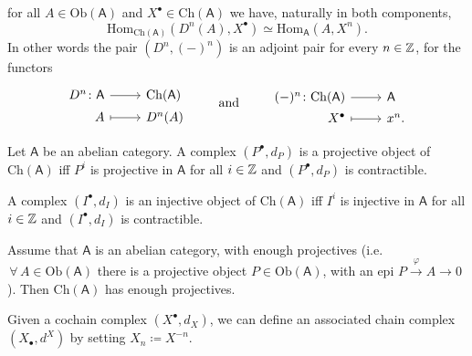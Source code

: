 \begin{lem}
	for all $A \in \mathrm{Ob} \left(\mathsf{A}\right)$ and $X^\bullet \in \mathrm{Ch}(\mathsf{A})$ we have,
	naturally in both components,
	\begin{equation}
		\mathrm{Hom}_{\mathrm{Ch}(\mathsf{A})} \left( D^n(A), X^\bullet \right) \simeq
		\mathrm{Hom}_{\mathsf{A}} \left( A, X^n \right)
	.\end{equation} 
	In other words the pair $(D^n, (-)^n)$ is an adjoint pair for every $n \in \mathbb{Z}$, for the functors
	\begin{equation*}
	\begin{tikzcd}[row sep = 0ex
		,/tikz/column 1/.append style={anchor=base east}
		,/tikz/column 2/.append style={anchor=base west}]
		D^n\colon \mathsf{A} \arrow[r, "", rightarrow] &
		\mathrm{Ch}(\mathsf{A}) \\
		A \arrow[r, "", mapsto] & D^n(A)
	\end{tikzcd}
	\qquad \text{ and } \qquad
	\begin{tikzcd}[row sep = 0ex
		,/tikz/column 1/.append style={anchor=base east}
		,/tikz/column 2/.append style={anchor=base west}]
		(-)^n\colon \mathrm{Ch}(\mathsf{A}) \arrow[r, "", rightarrow] &
		\mathsf{A} \\
		X^\bullet \arrow[r, "", mapsto] & x^n
	.\end{tikzcd}
	\end{equation*} 
\end{lem} 

\begin{prop}
	Let $\mathsf{A}$ be an abelian category.
	A complex $\left( P^{\bullet}, d_{P} \right)$ is a projective object of
	$\mathrm{Ch}(\mathsf{A})$ iff $P^i$ is projective in $\mathsf{A}$ for all
	$i \in \mathbb{Z}$ and $\left( P^{\bullet}, d_{P} \right)$ is contractible.

	A complex $\left( I^{\bullet}, d_{I} \right)$ is an injective object of
	$\mathrm{Ch}(\mathsf{A})$ iff $I^i$ is injective in $\mathsf{A}$ for all
	$i \in \mathbb{Z}$ and $\left( I^{\bullet}, d_{I} \right)$ is contractible.
\end{prop} 

\begin{lem}
	Assume that $\mathsf{A}$ is an abelian category, with enough
	projectives (i.e. $\,\forall\, A \in \mathrm{Ob} \left(\mathsf{A}\right)$ there is a
	projective object $P \in \mathrm{Ob} \left(\mathsf{A}\right)$, with an epi
	$P \xrightarrow{\varphi} A \to 0$).
	Then $\mathrm{Ch}(\mathsf{A})$ has enough projectives.
\end{lem} 

\begin{rem}[]
	Given a cochain complex $\left( X^{\bullet}, d_{X} \right)$, we can define an associated
	chain complex $\left( X_{\bullet}, d^{X} \right)$ by setting $X_n \coloneqq X^{-n}$.
\end{rem}
